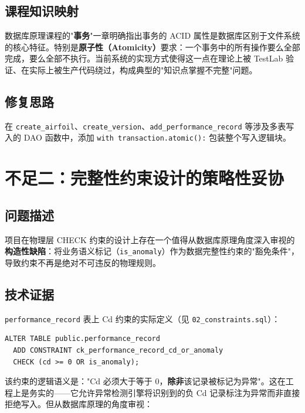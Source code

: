\documentclass[UTF8,a4paper,11pt]{ctexart}
\begin{document}
\subsection{课程知识映射}

数据库原理课程的"\textbf{事务}"一章明确指出事务的 ACID 属性是数据库区别于文件系统的核心特征。特别是\textbf{原子性（Atomicity）}要求：一个事务中的所有操作要么全部完成，要么全部不执行。当前系统的实现方式使得这一点在理论上被 TestLab 验证、在实际上被生产代码绕过，构成典型的"知识点掌握不完整"问题。

\subsection{修复思路}

在 \texttt{create\_airfoil}、\texttt{create\_version}、\texttt{add\_performance\_record} 等涉及多表写入的 DAO 函数中，添加 \texttt{with transaction.atomic():} 包装整个写入逻辑块。

\section{不足二：完整性约束设计的策略性妥协}

\subsection{问题描述}

项目在物理层 CHECK 约束的设计上存在一个值得从数据库原理角度深入审视的\textbf{构造性缺陷}：将业务语义标记（\texttt{is\_anomaly}）作为数据完整性约束的"豁免条件"，导致约束不再是绝对不可违反的物理规则。

\subsection{技术证据}

\texttt{performance\_record} 表上 Cd 约束的实际定义（见 \texttt{02\_constraints.sql}）：

\begin{lstlisting}[caption=条件化 CHECK 约束（02\_constraints.sql）]
ALTER TABLE public.performance_record
  ADD CONSTRAINT ck_performance_record_cd_or_anomaly
  CHECK (cd >= 0 OR is_anomaly);
\end{lstlisting}

该约束的逻辑语义是："Cd 必须大于等于 0，\textbf{除非}该记录被标记为异常"。这在工程上是务实的——它允许异常检测引擎将识别到的负 Cd 记录标注为异常而非直接拒绝写入。但从数据库原理的角度审视：
\end{document}
